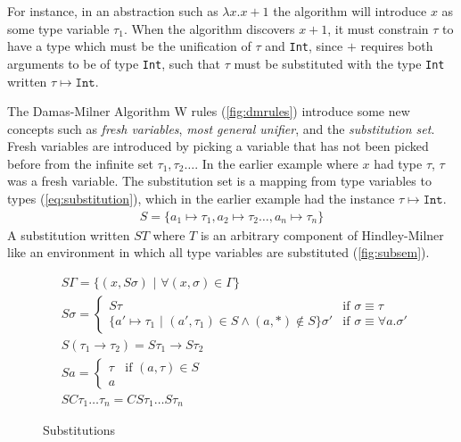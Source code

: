 For instance, in an abstraction such as $\lambda x.x + 1$ the algorithm will introduce $x$ as some type variable $\tau_1$.
When the algorithm discovers $x + 1$, it must constrain $\tau$ to have a type which must be the unification of $\tau$ and \texttt{Int}, since $+$ requires both arguments to be of type \texttt{Int}, such that $\tau$ must be substituted with the type \texttt{Int} written $\tau \mapsto \texttt{Int}$.

The Damas-Milner Algorithm W rules (\autoref{fig:dmrules}) introduce some new concepts such as \textit{fresh variables}, \textit{most general unifier}, and the \textit{substitution set}.
Fresh variables are introduced by picking a variable that has not been picked before from the infinite set $\tau_1, \tau_2 \dots $.
In the earlier example where $x$ had type $\tau$, $\tau$ was a fresh variable.
The substitution set is a mapping from type variables to types (\autoref{eq:substitution}), which in the earlier example had the instance $\tau \mapsto \texttt{Int}$.
\begin{align}
    S = \{ a_1 \mapsto \tau_1, a_2 \mapsto \tau_2 \dots , a_n \mapsto \tau_n \} 
    \label{eq:substitution}
\end{align}
A substitution written $S T$ where $T$ is an arbitrary component of Hindley-Milner like an environment in which all type variables are substituted (\autoref{fig:subsem}).
\begin{figure}
\begin{mdframed}
\begin{align}
    &S \Gamma = \{ (x, S \sigma) \,\,|\,\, \forall (x, \sigma) \in \Gamma \} \tag{Environment}\\
    &S \sigma  = 
        \begin{cases}
            S \tau & \text{if } \sigma \equiv \tau\\
            \{ a' \mapsto \tau_1 \,\,|\,\, (a', \tau_1) \in S \land (a, *) \notin S \} \sigma' & \text{if } \sigma \equiv \forall a . \sigma'
        \end{cases}
    \tag{Poly}\\
    &S (\tau_1 \rightarrow \tau_2) = S\tau_1 \rightarrow S\tau_2 \tag{Arrow}\\
    &S a = 
        \begin{cases}
            \tau & \text{if } (a, \tau) \in S\\
            a & 
        \end{cases}
    \tag{Typevariable}\\
    &S C \tau_1 \dots \tau_n = C S\tau_1 \dots S\tau_n \tag{Constructor}
\end{align}
\end{mdframed}
    \caption{Substitutions}
    \label{fig:subsem}
\end{figure}
